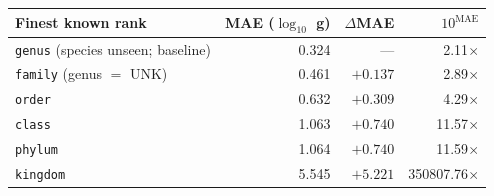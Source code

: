 \begin{tabular}{lrrr}
\toprule
Finest known rank & MAE ($\log_{10}$ g) & $\Delta$MAE & $10^{\mathrm{MAE}}$ \\
\midrule
\texttt{genus} (species unseen; baseline) & 0.324 & --- & 2.11$\times$ \\
\texttt{family} (genus $=$ UNK) & 0.461 & $+0.137$ & 2.89$\times$ \\
\texttt{order} & 0.632 & $+0.309$ & 4.29$\times$ \\
\texttt{class} & 1.063 & $+0.740$ & 11.57$\times$ \\
\texttt{phylum} & 1.064 & $+0.740$ & 11.59$\times$ \\
\texttt{kingdom} & 5.545 & $+5.221$ & 350807.76$\times$ \\
\bottomrule
\end{tabular}
